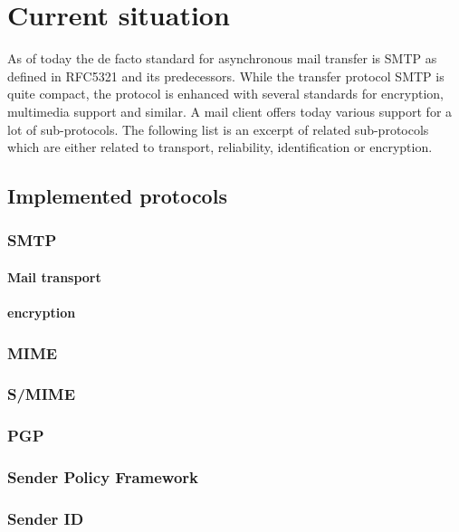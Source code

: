 \documentclass[11pt,a4paper]{book}
\begin{document}
\chapter{Current situation}
As of today the de facto standard for asynchronous mail transfer is SMTP as defined in RFC5321\cite{RFC5321} and its predecessors. While the transfer protocol SMTP is quite compact, the protocol is enhanced with several standards for encryption, multimedia support and similar. A mail client offers today various support for a lot of sub-protocols. The following list is an excerpt of related sub-protocols which are either related to transport, reliability, identification or encryption. 

\section{Implemented protocols}
\subsection{SMTP}
\cite{RFC5321}
\subsubsection{Mail transport}
\cite{RFC1870}
\subsubsection{encryption}

\subsection{MIME}
\cite{RFC2045}
\cite{RFC2046}
\cite{RFC2047}
\cite{RFC2048}
\cite{RFC2049}

\subsection{S/MIME}
\cite{RFC3851}

\subsection{PGP}
\cite{RFC2440}

\subsection{Sender Policy Framework}
\cite{RFC4408}
\cite{RFC6652}

\subsection{Sender ID}
\cite{RFC4401}
\end{document}
